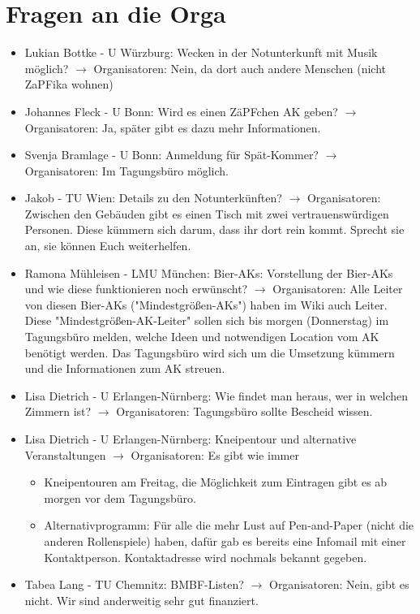 \section{Fragen an die Orga}
  \begin{itemize}
    \item Lukian Bottke - U Würzburg:  Wecken in der Notunterkunft mit Musik möglich? $\rightarrow$ Organisatoren: Nein, da dort auch andere Menschen (nicht ZaPFika wohnen)
    \item Johannes Fleck - U Bonn:  Wird es einen ZäPFchen AK geben? $\rightarrow$ Organisatoren: Ja, später gibt es dazu mehr Informationen.
    \item Svenja Bramlage - U Bonn:  Anmeldung für Spät-Kommer? $\rightarrow$ Organisatoren: Im Tagungsbüro möglich.
    \item  Jakob - TU Wien:  Details zu den Notunterkünften? $\rightarrow$ Organisatoren: Zwischen den Gebäuden gibt es einen Tisch mit zwei vertrauenswürdigen Personen. Diese kümmern sich darum, dass ihr dort rein kommt. Sprecht sie an, sie können Euch weiterhelfen.
    \item Ramona Mühleisen - LMU München:  Bier-AKs: Vorstellung der Bier-AKs und wie diese funktionieren noch erwünscht? $\rightarrow$ Organisatoren: Alle Leiter von diesen Bier-AKs ("Mindestgrößen-AKs") haben im Wiki auch Leiter. Diese "Mindestgrößen-AK-Leiter" sollen sich bis morgen (Donnerstag) im Tagungsbüro melden, welche Ideen und notwendigen Location vom AK benötigt werden. Das Tagungsbüro wird sich um die Umsetzung kümmern und die Informationen zum AK streuen.
    \item Lisa Dietrich - U Erlangen-Nürnberg:  Wie findet man heraus, wer in welchen Zimmern ist? $\rightarrow$ Organisatoren: Tagungsbüro sollte Bescheid wissen.
    \item Lisa Dietrich - U Erlangen-Nürnberg:  Kneipentour und alternative Veranstaltungen $\rightarrow$ Organisatoren: Es gibt wie immer
      \begin{itemize}
        \item Kneipentouren am Freitag, die Möglichkeit zum Eintragen gibt es ab morgen vor dem Tagungsbüro.
        \item Alternativprogramm: Für alle die mehr Lust auf Pen-and-Paper (nicht die anderen Rollenspiele) haben, dafür gab es bereits eine Infomail mit einer Kontaktperson. Kontaktadresse wird nochmals bekannt gegeben.
      \end{itemize}
    \item Tabea Lang - TU Chemnitz:  BMBF-Listen? $\rightarrow$ Organisatoren: Nein, gibt es nicht. Wir sind anderweitig sehr gut finanziert.

\end{itemize}
